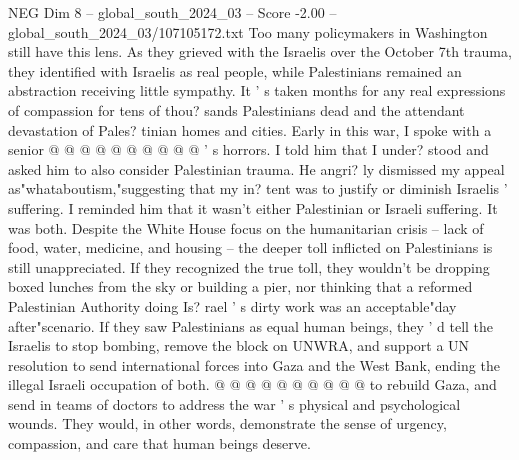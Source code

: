 \begin{textsample}{NEG Dim 8 – global\_south\_2024\_03 – Score -2.00 – global\_south\_2024\_03/107105172.txt}
Too many policymakers in Washington still have this lens.
As they grieved with the Israelis over the October 7th trauma, they identified with Israelis as real people, while Palestinians remained an abstraction receiving little sympathy.
It ' s taken months for any real expressions of compassion for tens of thou? sands Palestinians dead and the attendant devastation of Pales? tinian homes and cities.
Early in this war, I spoke with a senior @ @ @ @ @ @ @ @ @ @ ' s horrors.
I told him that I under? stood and asked him to also consider Palestinian trauma.
He angri? ly dismissed my appeal as"whataboutism,"suggesting that my in? tent was to justify or diminish Israelis ' suffering.
I reminded him that it wasn't either Palestinian or Israeli suffering.
It was both.
Despite the White House focus on the humanitarian crisis -- lack of food, water, medicine, and housing -- the deeper toll inflicted on Palestinians is still unappreciated.
If they recognized the true toll, they wouldn't be dropping boxed lunches from the sky or building a pier, nor thinking that a reformed Palestinian Authority doing Is? rael ' s dirty work was an acceptable"day after"scenario.
If they saw Palestinians as equal human beings, they ' d tell the Israelis to stop bombing, remove the block on UNWRA, and support a UN resolution to send international forces into Gaza and the West Bank, ending the illegal Israeli occupation of both. @ @ @ @ @ @ @ @ @ @ to rebuild Gaza, and send in teams of doctors to address the war ' s physical and psychological wounds.
They would, in other words, demonstrate the sense of urgency, compassion, and care that human beings deserve.

\end{textsample}
